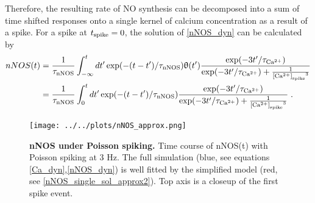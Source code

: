 \documentclass[10pt,letterpaper]{article}
\begin{document}
Therefore, the resulting rate of NO synthesis can be decomposed into a sum of time shifted responses onto a single kernel of calcium concentration as a result of a spike. For a spike at $t_{\rm spike}=0$, the solution of \eqref{nNOS_dyn} can be calculated by
\begin{equation}
\begin{split}
nNOS(t) &= \frac{1}{\tau_{\rm nNOS}}\int_{-\infty}^t dt' \exp(-(t-t')/\tau_{\rm nNOS}) \uptheta(t') \frac{\exp(-3t'/\tau_{\rm Ca^{2+}})}{\exp(-3t'/\tau_{\rm Ca^{2+}}) + \frac{1}{{{\rm [Ca^{2+}]}_{\rm spike}}^3}} \\
&= \frac{1}{\tau_{\rm nNOS}}\int_{0}^t dt' \exp(-(t-t')/\tau_{\rm nNOS}) \frac{\exp(-3t'/\tau_{\rm Ca^{2+}})}{\exp(-3t'/\tau_{\rm Ca^{2+}}) + \frac{1}{{{\rm [Ca^{2+}]}_{\rm spike}}^3}}\;.
\end{split}\label{nNOS_single_sol}
\end{equation}

\begin{figure}
\begin{center}
\texttt{[image: ../../plots/nNOS\_approx.png]}
\end{center}
\caption{{\bf nNOS under Poisson spiking.} Time course of nNOS(t) with Poisson spiking at 3 Hz. The full simulation (blue, see equations \eqref{Ca_dyn},\eqref{nNOS_dyn}) is well fitted by the simplified model (red, see \eqref{nNOS_single_sol_approx2}). Top axis is a closeup of the first spike event.}
\label{nNOS_approx_plot}
\end{figure}
\end{document}
